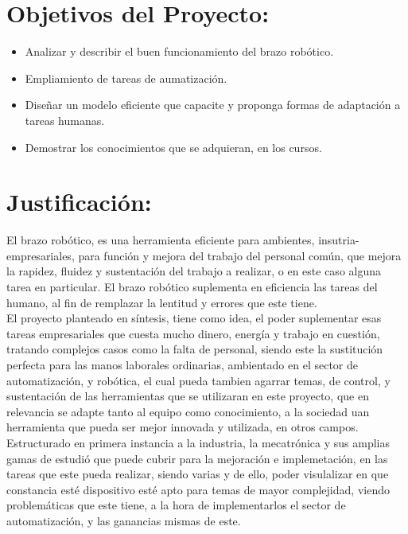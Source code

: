 \documentclass[14pt,a4paper]{article}
\begin{document}
\section{Objetivos del Proyecto:}

\begin{itemize}
\item Analizar y describir el buen funcionamiento del brazo robótico.
\item Empliamiento de tareas de aumatización.
\item Diseñar un modelo eficiente que capacite y proponga formas de adaptación a tareas humanas.
\item Demostrar los conocimientos que se adquieran, en los cursos. 
\end{itemize}

\section{Justificación:}

El brazo robótico, es una herramienta eficiente para ambientes, insutria-empresariales, para función y mejora del trabajo del personal común, que mejora la rapidez, fluidez y sustentación del trabajo a realizar, o en este caso alguna tarea en particular. El brazo robótico suplementa en eficiencia las tareas del humano, al fin de remplazar la lentitud y errores que este tiene.\\
El proyecto planteado en síntesis, tiene como idea, el  poder suplementar esas tareas empresariales que cuesta mucho dinero, energía y trabajo en cuestión, tratando complejos casos como la falta de personal, siendo este la sustitución perfecta para las manos laborales ordinarias, ambientado en el sector de automatización, y robótica, el cual pueda tambien agarrar temas, de control, y sustentación de las herramientas que se utilizaran en este proyecto, que en relevancia se adapte tanto al equipo como conocimiento, a la sociedad uan herramienta que pueda ser mejor innovada y utilizada, en otros campos.\\
Estructurado en primera instancia a la industria, la mecatrónica y sus amplias gamas de estudió que puede cubrir para la mejoración e implemetación, en las tareas que este pueda realizar, siendo varias y de ello, poder visulalizar en que constancia esté dispositivo esté apto para temas de mayor complejidad, viendo problemáticas que este tiene, a la  hora de implementarlos el sector de automatización, y las ganancias mismas de este.
\end{document}

